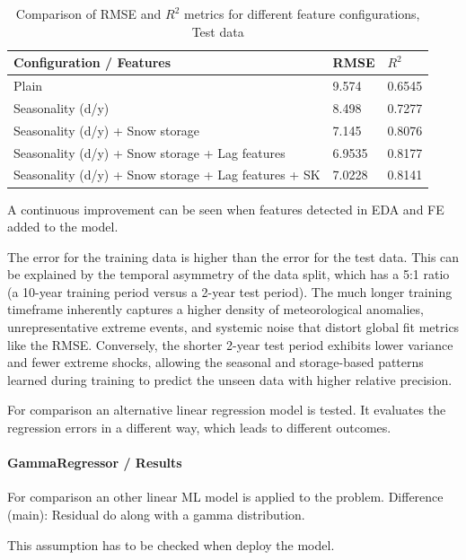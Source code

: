 \documentclass[a4paper,12pt]{article}
\begin{document}
\begin{table}[H]
    \centering
    \caption{Comparison of RMSE and $R^2$ metrics for different feature configurations, Test data}
    \label{tab:ml_metrics_comparison}
    \begin{tabular}{lll}
        \toprule
        \textbf{Configuration / Features} & {\textbf{RMSE}} & {\textbf{$R^2$}} \\
        \midrule
        Plain & 9.574 & 0.6545 \\
        Seasonality (d/y) & 8.498 & 0.7277 \\
        Seasonality (d/y) + Snow storage & 7.145 & 0.8076 \\
        Seasonality (d/y) + Snow storage + Lag features & 6.9535 & 0.8177 \\
        Seasonality (d/y) + Snow storage + Lag features + SK & 7.0228 & 0.8141 \\
        \bottomrule
    \end{tabular}
\end{table}

A continuous improvement can be seen when features detected in EDA and FE added to the model.

The error for the training data is higher than the error for the test data. This can be explained by the temporal asymmetry of the data split, which has a 5:1 ratio (a 10-year training period versus a 2-year test period). The much longer training timeframe inherently captures a higher density of meteorological anomalies, unrepresentative extreme events, and systemic noise that distort global fit metrics like the RMSE. Conversely, the shorter 2-year test period exhibits lower variance and fewer extreme shocks, allowing the seasonal and storage-based patterns learned during training to predict the unseen data with higher relative precision.

For comparison an alternative linear regression model is tested.
It evaluates the regression errors in a different way, which leads to different outcomes.

\paragraph*{GammaRegressor / Results}

For comparison an other linear ML model is applied to the problem. Difference (main): Residual do along with a gamma distribution.

This assumption has to be checked when deploy the model.
\end{document}
